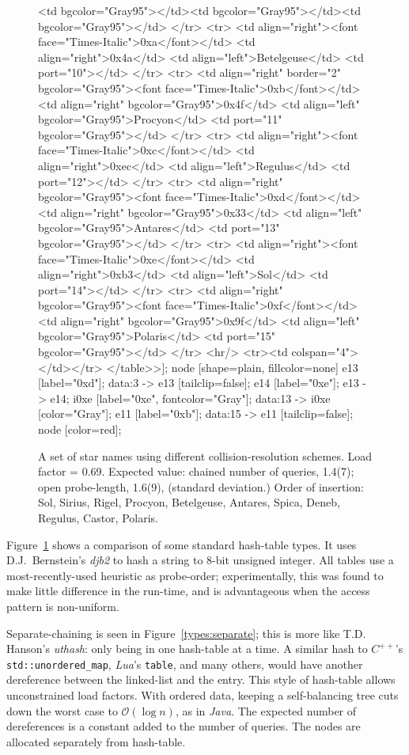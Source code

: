 \documentclass[12pt]{article}
\newcommand{\code}[1]{\colorbox{light-gray}{\texttt{#1}}}
\begin{document}
\begin{figure}
{{		<td bgcolor="Gray95"></td><td bgcolor="Gray95"></td><td bgcolor="Gray95"></td>
	</tr>
	<tr>
		<td align="right"><font face="Times-Italic">0xa</font></td>
		<td align="right">0x4a</td>
		<td align="left">Betelgeuse</td>
		<td port="10">
	</tr>
	<tr>
		<td align="right" border="2" bgcolor="Gray95"><font face="Times-Italic">0xb</font></td>
		<td align="right" bgcolor="Gray95">0x4f</td>
		<td align="left" bgcolor="Gray95">Procyon</td>
		<td port="11" bgcolor="Gray95">
	</tr>
	<tr>
		<td align="right"><font face="Times-Italic">0xc</font></td>
		<td align="right">0xec</td>
		<td align="left">Regulus</td>
		<td port="12">
	</tr>
	<tr>
		<td align="right" bgcolor="Gray95"><font face="Times-Italic">0xd</font></td>
		<td align="right" bgcolor="Gray95">0x33</td>
		<td align="left" bgcolor="Gray95">Antares</td>
		<td port="13" bgcolor="Gray95">
	</tr>
	<tr>
		<td align="right"><font face="Times-Italic">0xe</font></td>
		<td align="right">0xb3</td>
		<td align="left">Sol</td>
		<td port="14">
	</tr>
	<tr>
		<td align="right" bgcolor="Gray95"><font face="Times-Italic">0xf</font></td>
		<td align="right" bgcolor="Gray95">0x9f</td>
		<td align="left" bgcolor="Gray95">Polaris</td>
		<td port="15" bgcolor="Gray95">
	</tr>
	<hr/>
	<tr><td colspan="4"></td></tr>
</table>>];
	node [shape=plain, fillcolor=none]
	e13 [label="0xd"];
	data:3 -> e13 [tailclip=false];
	e14 [label="0xe"];
	e13 -> e14;
	i0xe [label="0xe", fontcolor="Gray"];
	data:13 -> i0xe [color="Gray"];
	e11 [label="0xb"];
	data:15 -> e11 [tailclip=false];
	node [color=red];
		}
	}
	\caption{A set of star names using different collision-resolution schemes. Load factor  = 0.69. Expected value: chained number of queries, 1.4(7);
open probe-length, 1.6(9),
(standard deviation.)\label{types}
Order of insertion: Sol, Sirius, Rigel, Procyon, Betelgeuse, Antares, Spica, Deneb, Regulus, Castor, Polaris.}
\end{figure}

Figure~\ref{types} shows a comparison of some standard hash-table types. It uses D.J.~Bernstein's {\it djb2} to hash a string to 8-bit unsigned integer. All tables use a most-recently-used heuristic as probe-order; experimentally, this was found to make little difference in the run-time, and is advantageous when the access pattern is non-uniform\cite{brent1973reducing, sleator1985self}.

Separate-chaining is seen in Figure~\ref{types:separate}; this is more like T.D. Hanson's {\it uthash}: only being in one hash-table at a time. A similar hash to {\it $C^{++}$}'s \code{std::unordered\_map}, {\it Lua}'s \code{table}, and many others, would have another dereference between the linked-list and the entry. This style of hash-table allows unconstrained load factors. With ordered data, keeping a self-balancing tree cuts down the worst case to $\mathcal{O}(\log n)$\cite{knuth1998sorting}, as in {\it Java}. The expected number of dereferences is a constant added to the number of queries. The nodes are allocated separately from hash-table.
\end{document}
